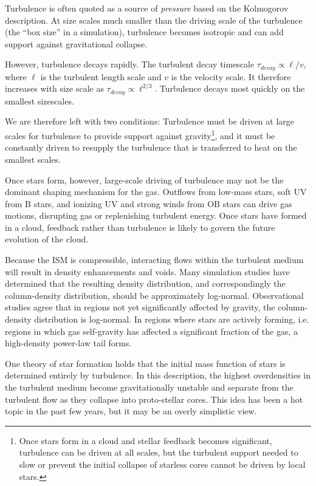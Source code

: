 Turbulence is often quoted as a source of \emph{pressure} based on the
Kolmogorov description.  At size scales much smaller than the driving scale of
the turbulence (the ``box size'' in a simulation), turbulence becomes isotropic
and can add support against gravitational collapse.  

However, turbulence decays rapidly.  The turbulent decay timescale
$\tau_{decay}\propto \ell / v$, where $\ell$ is the turbulent length scale and $v$ is
the velocity scale.  It therefore increases with size scale as
$\tau_{decay}\propto \ell^{2/3}$.  Turbulence decays most quickly on the smallest
sizescales.

We are therefore left with two conditions: Turbulence must be driven at large
scales for turbulence to provide support against gravity\footnote{Once stars form
in a cloud and stellar feedback becomes significant, turbulence can be driven at all
scales, but the turbulent support needed to slow or prevent the initial
collapse of starless cores cannot be driven by local stars.}, and it must be
constantly driven to resupply the turbulence that is transferred to heat on the
smallest scales.

Once stars form, however, large-scale driving of turbulence may not be the
dominant shaping mechanism for the gas.  Outflows from low-mass stars, soft UV
from B stars, and ionizing UV and strong winds from OB stars can drive gas
motions, disrupting gas or replenishing turbulent energy.  Once stars have
formed in a cloud, feedback rather than turbulence is likely to govern the
future evolution of the cloud.

Because the ISM is compressible, interacting flows within the turbulent medium
will result in density enhancements and voids.  Many simulation studies have
determined that the resulting density distribution, and correspondingly the
column-density distribution, should be approximately log-normal.  Observational
studies agree that in regions not yet significantly affected by gravity, the 
column-density distribution is log-normal.  In regions where stars are actively
forming, i.e. regions in which gas self-gravity has affected a significant fraction
of the gas, a high-density power-law tail forms.

One theory of star formation holds that the initial mass function of stars is
determined entirely by turbulence.  In this description, the highest
overdensities in the turbulent medium become gravitationally unstable and
separate from the turbulent flow as they collapse into proto-stellar cores.
This idea has been a hot topic in the past few years, but it may be an overly
simplistic view.

